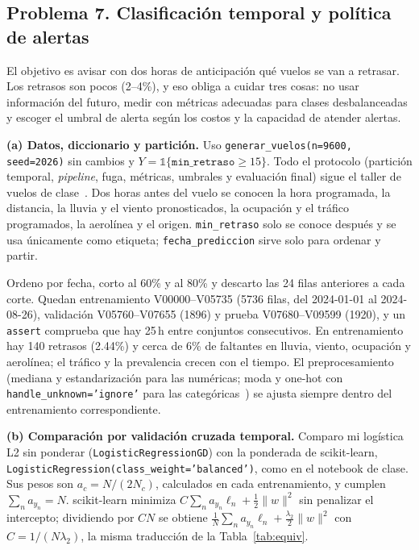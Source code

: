 \documentclass[10pt,a4paper]{article}
\begin{document}
\subsection*{Problema 7. Clasificación temporal y política de alertas}
El objetivo es avisar con dos horas de anticipación qué vuelos se van a retrasar. Los retrasos son pocos (2--4\%), y eso obliga a cuidar tres cosas: no usar información del futuro, medir con métricas adecuadas para clases desbalanceadas y escoger el umbral de alerta según los costos y la capacidad de atender alertas.

\textbf{(a) Datos, diccionario y partición.}
Uso \texttt{generar\_vuelos(n=9600, seed=2026)} sin cambios y $Y=\mathbb 1\{\texttt{min\_retraso}\ge15\}$. Todo el protocolo (partición temporal, \emph{pipeline}, fuga, métricas, umbrales y evaluación final) sigue el taller de vuelos de clase~\cite{nbvuelos}. Dos horas antes del vuelo se conocen la hora programada, la distancia, la lluvia y el viento pronosticados, la ocupación y el tráfico programados, la aerolínea y el origen. \texttt{min\_retraso} solo se conoce después y se usa únicamente como etiqueta; \texttt{fecha\_prediccion} sirve solo para ordenar y partir.

Ordeno por fecha, corto al 60\% y al 80\% y descarto las 24 filas anteriores a cada corte. Quedan entrenamiento V00000--V05735 (5736 filas, del 2024-01-01 al 2024-08-26), validación V05760--V07655 (1896) y prueba V07680--V09599 (1920), y un \texttt{assert} comprueba que hay 25\,h entre conjuntos consecutivos. En entrenamiento hay 140 retrasos (2.44\%) y cerca de 6\% de faltantes en lluvia, viento, ocupación y aerolínea; el tráfico y la prevalencia crecen con el tiempo. El preprocesamiento (mediana y estandarización para las numéricas; moda y one-hot con \texttt{handle\_unknown='ignore'} para las categóricas~\cite[secc.~1.5.3 y 1.5.5]{pml1}) se ajusta siempre dentro del entrenamiento correspondiente.

\textbf{(b) Comparación por validación cruzada temporal.}
Comparo mi logística L2 sin ponderar (\texttt{LogisticRegressionGD}) con la ponderada de scikit-learn, \texttt{LogisticRegression(class\_weight='balanced')}, como en el notebook de clase. Sus pesos son $a_c=N/(2N_c)$, calculados en cada entrenamiento, y cumplen $\sum_na_{y_n}=N$. scikit-learn minimiza $C\sum_na_{y_n}\ell_n+\frac12\lVert w\rVert^2$ sin penalizar el intercepto; dividiendo por $CN$ se obtiene $\frac1N\sum_na_{y_n}\ell_n+\frac{\lambda_2}{2}\lVert w\rVert^2$ con $C=1/(N\lambda_2)$, la misma traducción de la Tabla~\ref{tab:equiv}.
\end{document}
